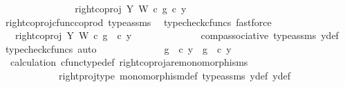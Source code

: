 \begin{isabellebody}
\ \ \ \ \ \ \ \ \ \ \isamarkupfalse%
\ \isamarkupfalse%
\ {\isachardoublequoteopen}{\isachardot}{\kern0pt}{\isachardot}{\kern0pt}{\isachardot}{\kern0pt}\ {\isacharequal}{\kern0pt}\ {\isacharparenleft}{\kern0pt}right{\isacharunderscore}{\kern0pt}coproj\ Y\ W\ {\isasymcirc}\isactrlsub c\ g{\isacharparenright}{\kern0pt}\ {\isasymcirc}\isactrlsub c\ y{}{\isachardoublequoteclose}\isanewline
\ \ \ \ \ \ \ \ \ \ \ \ \isamarkupfalse%
\ right{\isacharunderscore}{\kern0pt}coproj{\isacharunderscore}{\kern0pt}cfunc{\isacharunderscore}{\kern0pt}coprod\ type{\isacharunderscore}{\kern0pt}assms\ \isamarkupfalse%
\ {\isacharparenleft}{\kern0pt}typecheck{\isacharunderscore}{\kern0pt}cfuncs{\isacharcomma}{\kern0pt}\ fastforce{\isacharparenright}{\kern0pt}\isanewline
\ \ \ \ \ \ \ \ \ \ \isamarkupfalse%
\ \isamarkupfalse%
\ {\isachardoublequoteopen}{\isachardot}{\kern0pt}{\isachardot}{\kern0pt}{\isachardot}{\kern0pt}\ {\isacharequal}{\kern0pt}\ right{\isacharunderscore}{\kern0pt}coproj\ Y\ W\ {\isasymcirc}\isactrlsub c\ g\ \ {\isasymcirc}\isactrlsub c\ y{}{\isachardoublequoteclose}\isanewline
\ \ \ \ \ \ \ \ \ \ \ \ \isamarkupfalse%
\ comp{\isacharunderscore}{\kern0pt}associative{}\ type{\isacharunderscore}{\kern0pt}assms{\isacharparenleft}{\kern0pt}{}{\isacharparenright}{\kern0pt}\ y{}{\isacharunderscore}{\kern0pt}def\ \isamarkupfalse%
\ {\isacharparenleft}{\kern0pt}typecheck{\isacharunderscore}{\kern0pt}cfuncs{\isacharcomma}{\kern0pt}\ auto{\isacharparenright}{\kern0pt}\isanewline
\ \ \ \ \ \ \ \ \ \ \isamarkupfalse%
\ \isamarkupfalse%
\ {\isachardoublequoteopen}g\ \ {\isasymcirc}\isactrlsub c\ y{}\ {\isacharequal}{\kern0pt}\ g\ \ {\isasymcirc}\isactrlsub c\ y{}{\isachardoublequoteclose}\isanewline
\ \ \ \ \ \ \ \ \ \ \ \ \isamarkupfalse%
\ \ calculation\ cfunc{\isacharunderscore}{\kern0pt}type{\isacharunderscore}{\kern0pt}def\ right{\isacharunderscore}{\kern0pt}coproj{\isacharunderscore}{\kern0pt}are{\isacharunderscore}{\kern0pt}monomorphisms\isanewline
\ \ \ \ \ \ \ \ \ \ \ \ right{\isacharunderscore}{\kern0pt}proj{\isacharunderscore}{\kern0pt}type\ monomorphism{\isacharunderscore}{\kern0pt}def\ type{\isacharunderscore}{\kern0pt}assms{\isacharparenleft}{\kern0pt}{}{\isacharparenright}{\kern0pt}\ y{}{\isacharunderscore}{\kern0pt}def\ y{}{\isacharunderscore}{\kern0pt}def\ \isamarkupfalse%

\end{isabellebody}
